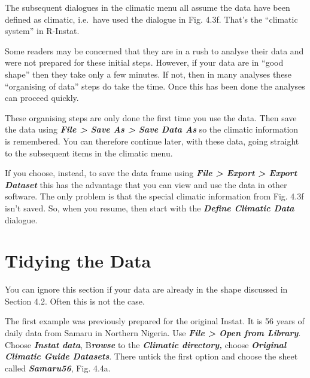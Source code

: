 \documentclass[
  letterpaper,
  DIV=11,
  numbers=noendperiod]{scrreprt}
\begin{document}
The subsequent dialogues in the climatic menu all assume the data have
been defined as climatic, i.e.~have used the dialogue in Fig. 4.3f.
That's the ``climatic system'' in R-Instat.

Some readers may be concerned that they are in a rush to analyse their
data and were not prepared for these initial steps. However, if your
data are in ``good shape'' then they take only a few minutes. If not,
then in many analyses these ``organising of data'' steps do take the
time. Once this has been done the analyses can proceed quickly.

These organising steps are only done the first time you use the data.
Then save the data using \textbf{\emph{File \textgreater{} Save As
\textgreater{} Save Data As}} so the climatic information is remembered.
You can therefore continue later, with these data, going straight to the
subsequent items in the climatic menu.

If you choose, instead, to save the data frame using \textbf{\emph{File
\textgreater{} Export \textgreater{} Export Dataset}} this has the
advantage that you can view and use the data in other software. The only
problem is that the special climatic information from Fig. 4.3f isn't
saved. So, when you resume, then start with the \textbf{\emph{Define
Climatic Data}} dialogue.

\section{Tidying the Data}\label{tidying-the-data}

You can ignore this section if your data are already in the shape
discussed in Section 4.2. Often this is not the case.

The first example was previously prepared for the original Instat. It is
56 years of daily data from Samaru in Northern Nigeria. Use
\textbf{\emph{File \textgreater{} Open from Library}}. Choose
\textbf{\emph{Instat data}}, B\textbf{\emph{rowse}} to the
\textbf{\emph{Climatic directory,}} choose \textbf{\emph{Original
Climatic Guide Datasets}}. There untick the first option and choose the
sheet called \textbf{\emph{Samaru56}}, Fig. 4.4a.
\end{document}
